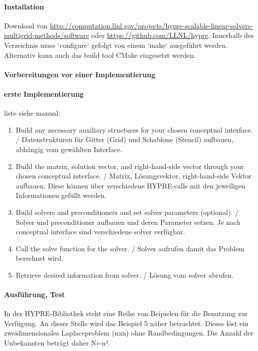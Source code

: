 \documentclass[a4paper,10pt]{article}
\begin{document}
\paragraph{Installation}

Download von \url{http://computation.llnl.gov/projects/hypre-scalable-linear-solvers-multigrid-methods/software} oder \url{https://github.com/LLNL/hypre}.
Innerhalb des Verzeichnis muss `configure` gefolgt von einem `make` ausgeführt werden.
Alternativ kann auch das build tool CMake eingesetzt werden.

\paragraph{Vorbereitungen vor einer Implementierung}

\paragraph{erste Implementierung}

liste siehe manual:

\begin{enumerate}
 \item Build any necessary auxiliary structures for your chosen conceptual interface. /
 Datenstrukturen für Gitter (Grid) und Schablone (Stencil) aufbauen, abhängig vom gewählten Interface.
 \item Build the matrix, solution vector, and right-hand-side vector through your chosen conceptual interface. /
 Matrix, Lösungsvektor, right-hand-side Vektor aufbauen. 
 Diese können über verschiedene HYPRE-calls mit den jeweiligen Informationen gefüllt werden.
 \item Build solvers and preconditioners and set solver parameters (optional). /
 Solver und preconditioner aufbauen und deren Parameter setzen.
 Je nach conceptual interface sind verschiedene solver verfügbar.
 \item Call the solve function for the solver. /
 Solver aufrufen damit das Problem berechnet wird.
 \item Retrieve desired information from solver. /
 Lösung vom solver abrufen.
\end{enumerate}

\paragraph{Ausführung, Test}

In der HYPRE-Bibliothek steht eine Reihe von Beipielen für die Benutzung zur Verfügung.
An dieser Stelle wird das Beispiel 5 näher betrachtet.
Dieses löst ein zweidimensionales Laplaceproblem (nxn) ohne Randbedingungen.
Die Anzahl der Unbekannten beträgt daher N=n².
\end{document}
